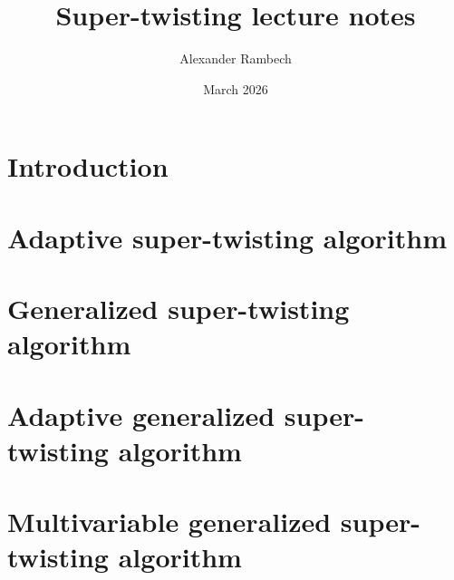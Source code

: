 \documentclass{article}
\title{Super-twisting lecture notes}
\author{Alexander Rambech}
\date{March 2026}
\begin{document}
\maketitle

\section{Introduction}


\section{Adaptive super-twisting algorithm}


\section{Generalized super-twisting algorithm}


\section{Adaptive generalized super-twisting algorithm}


\section{Multivariable generalized super-twisting algorithm}




\end{document}
